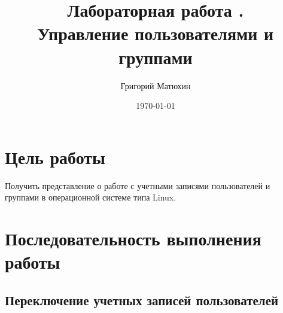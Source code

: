\documentclass[12pt]{article}
\author{Григорий Матюхин}
\date{\today}
\title{Лабораторная работа \textnumero2.\\Управление пользователями и группами}
\begin{document}
  \maketitle
  \newpage
  \tableofcontents
  \newpage
  \section{Цель работы}
    Получить представление о работе с учетными записями пользователей и группами в операционной системе типа Linux.
  \section{Последовательность выполнения работы}
    \subsection{Переключение учетных записей пользователей}
\end{document}
